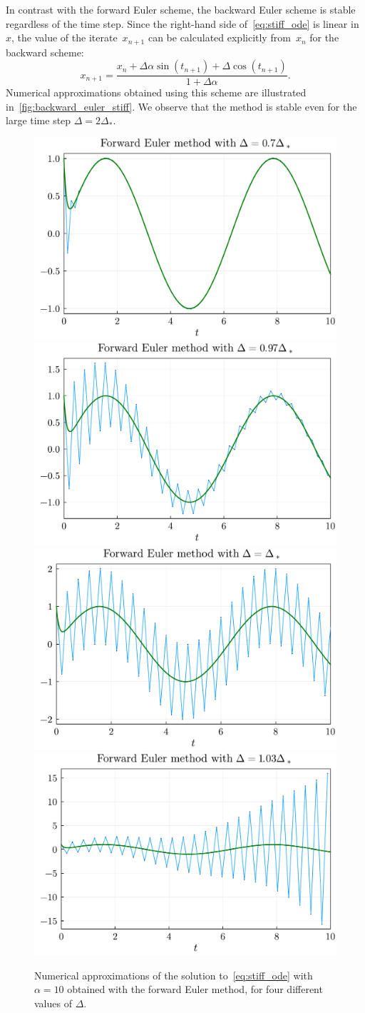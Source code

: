 In contrast with the forward Euler scheme,
the backward Euler scheme is stable regardless of the time step.
Since the right-hand side of~\eqref{eq:stiff_ode} is linear in~$x$,
the value of the iterate~$x_{n+1}$ can be calculated explicitly from~$x_n$ for the backward scheme:
\[
    x_{n+1} = \frac{x_n + \Delta \alpha \sin(t_{n+1}) + \Delta \cos(t_{n+1})}{1 + \Delta \alpha}.
\]
Numerical approximations obtained using this scheme are illustrated in~\cref{fig:backward_euler_stiff}.
We observe that the method is stable even for the large time step $\Delta = 2 \Delta_*$.

\begin{figure}[ht]
    \centering
    \includegraphics[width=0.48\linewidth]{figures/stiff_forward_euler_0_7.pdf}
    \includegraphics[width=0.48\linewidth]{figures/stiff_forward_euler_0_97.pdf}
    \includegraphics[width=0.48\linewidth]{figures/stiff_forward_euler_1_00.pdf}
    \includegraphics[width=0.48\linewidth]{figures/stiff_forward_euler_1_03.pdf}
    \caption{%
        Numerical approximations of the solution to~\eqref{eq:stiff_ode} with $\alpha = 10$ obtained with the forward Euler method,
        for four different values of $\Delta$.
    }%
    \label{fig:forward_euler_stiff}
\end{figure}

